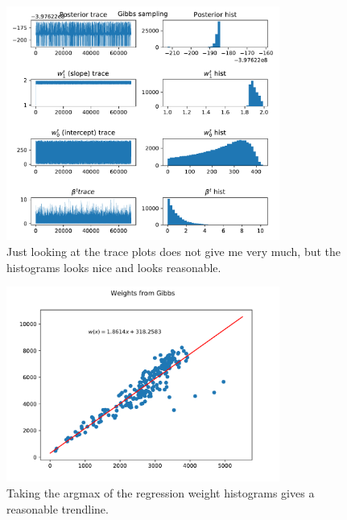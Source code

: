 \documentclass[12pt]{article}
\begin{document}
        \begin{figure}[H]
            \centering
            \includegraphics[width=0.8\textwidth]{gibbs.pdf}
            \caption{Just looking at the trace plots does not give me very much, but the histograms looks nice and looks reasonable.}
        \end{figure}
        \begin{figure}[H]
            \centering
            \includegraphics[width=0.8\textwidth]{regline_gibbs.pdf}
            \caption{Taking the argmax of the regression weight histograms gives a reasonable trendline.}
        \end{figure}
\end{document}
